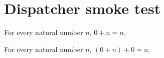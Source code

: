 
\chapter{Dispatcher smoke test}
\label{chap:dispatch-test}

\begin{lemma}
\label{lem:add-zero-left}
For every natural number $n$, $0 + n = n$.
\end{lemma}

\begin{lemma}
\label{lem:add-zero-both}
For every natural number $n$, $(0 + n) + 0 = n$.
\end{lemma}

